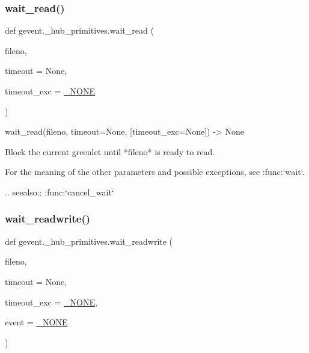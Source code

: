 \subsubsection{\texorpdfstring{wait\+\_\+read()}{wait\_read()}}
{\footnotesize\ttfamily def gevent.\+\_\+hub\+\_\+primitives.\+wait\+\_\+read (\begin{DoxyParamCaption}\item[{}]{fileno,  }\item[{}]{timeout = {\ttfamily None},  }\item[{}]{timeout\+\_\+exc = {\ttfamily \hyperlink{classgevent_1_1__util_1_1___n_o_n_e}{\+\_\+\+N\+O\+NE}} }\end{DoxyParamCaption})}

\begin{DoxyVerb}wait_read(fileno, timeout=None, [timeout_exc=None]) -> None

Block the current greenlet until *fileno* is ready to read.

For the meaning of the other parameters and possible exceptions,
see :func:`wait`.

.. seealso:: :func:`cancel_wait`
\end{DoxyVerb}
 \mbox{\label{namespacegevent_1_1__hub__primitives_af51473b17ea50f4388118cb6ba839a1e}} 
\subsubsection{\texorpdfstring{wait\+\_\+readwrite()}{wait\_readwrite()}}
{\footnotesize\ttfamily def gevent.\+\_\+hub\+\_\+primitives.\+wait\+\_\+readwrite (\begin{DoxyParamCaption}\item[{}]{fileno,  }\item[{}]{timeout = {\ttfamily None},  }\item[{}]{timeout\+\_\+exc = {\ttfamily \hyperlink{classgevent_1_1__util_1_1___n_o_n_e}{\+\_\+\+N\+O\+NE}},  }\item[{}]{event = {\ttfamily \hyperlink{classgevent_1_1__util_1_1___n_o_n_e}{\+\_\+\+N\+O\+NE}} }\end{DoxyParamCaption})}


